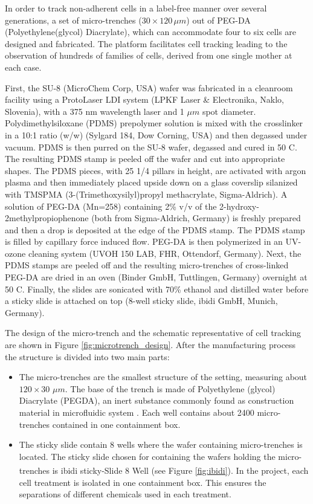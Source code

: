 \documentclass[pdftex,12pt,a4paper]{report}
\begin{document}
In order to track non-adherent cells in a label-free manner over several generations, a set of micro-trenches ($30 \times 120 \, \mu m$) out of PEG-DA (Polyethylene(glycol) Diacrylate), which can accommodate four to six cells are designed and fabricated. The platform facilitates cell tracking leading to the observation of hundreds of families of cells, derived from one single mother at each case.

First, the SU-8 (MicroChem Corp, USA) wafer was fabricated in a cleanroom facility using a ProtoLaser LDI system (LPKF Laser \& Electronika, Naklo, Slovenia), with a 375 nm wavelength laser and 1 $\mu m$ spot diameter.
Polydimethylsiloxane (PDMS) prepolymer solution is mixed with the crosslinker in a 10:1 ratio (w/w) (Sylgard 184, Dow Corning, USA) and then degassed under vacuum. PDMS is then purred on the SU-8 wafer, degassed and cured in 50 \degree C. The resulting PDMS stamp is peeled off the wafer and cut into appropriate shapes. The PDMS pieces, with 25 1/4 pillars in height, are activated with argon plasma and then immediately placed upside down on a glass coverslip  silanized with TMSPMA (3-(Trimethoxysilyl)propyl methacrylate, Sigma-Aldrich). A solution of PEG-DA (Mn=258) containing 2\% v/v of the 2-hydroxy-2methylpropiophenone (both from Sigma-Aldrich, Germany) is freshly prepared and then a drop is deposited at the edge of the PDMS stamp. The PDMS stamp is filled by capillary force induced flow. PEG-DA is then polymerized in an UV-ozone cleaning system (UVOH 150 LAB, FHR, Ottendorf, Germany). Next, the PDMS stamps are peeled off and the resulting micro-trenches of cross-linked PEG-DA are dried in an oven (Binder GmbH, Tuttlingen, Germany) overnight at 50 \degree C. Finally, the slides are sonicated with 70\% ethanol and distilled water before a sticky slide is attached on top (8-well sticky slide, ibidi GmbH, Munich, Germany).

The design of the micro-trench and the schematic representative of cell tracking are shown in Figure \ref{fig:microtrench_design}. After the manufacturing process the structure is divided into two main parts:

\begin{itemize}
\item The micro-trenches are the smallest structure of the setting, measuring about $120 \times 30$ $\mu m$. The base of the trench is made of Polyethylene (glycol) Diacrylate (PEGDA), an inert substance commonly found as construction material in microfluidic system \cite{sekhavati2015marker}. Each well contains about 2400 micro-trenches contained in one containment box.

\item The sticky slide contain 8 wells where the wafer containing micro-trenches is located. The sticky slide chosen for containing the wafers holding the micro-trenches is ibidi\textsuperscript{\textregistered} sticky-Slide 8 Well (see Figure \ref{fig:ibidi}). In the project, each cell treatment is isolated in one containment box. This ensures
 the separations of different chemicals used in each treatment.

\end{itemize}
\end{document}
